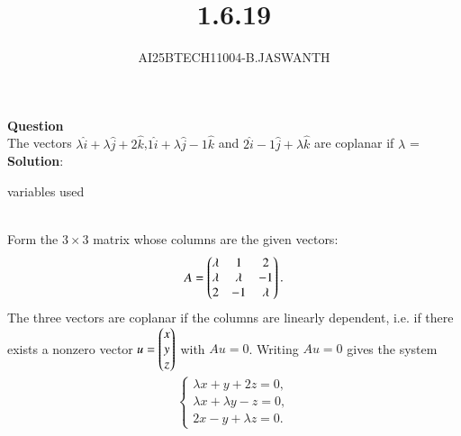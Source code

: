 \documentclass[journal]{IEEEtran}
\begin{document}

\vspace{3cm}


\renewcommand{\thetable}{\theenumi}




\vspace{3cm}


\title{1.6.19}
\author{AI25BTECH11004-B.JASWANTH}
{\let\newpage\relax\maketitle}


\renewcommand{\thefigure}{\theenumi}
\renewcommand{\thetable}{\theenumi}
\setlength{\intextsep}{10pt} %

\textbf{Question}\\
The vectors $\lambda\hat{i}+\lambda\hat{j}+2\hat{k}$,$1\hat{i}+\lambda\hat{j}-1\hat{k}$ and $2\hat{i}-1\hat{j}+\lambda\hat{k}$ are coplanar if $\lambda$ = \\
\textbf{Solution}: \\
\begin{table}[h!]
	\centering
	
	\caption{variables used}
	\label{}
\end{table}\\

Form the \(3\times3\) matrix whose columns are the given vectors:
\begin{align*}
A=\begin{pmatrix}\lambda & 1 & 2\\
\lambda & \lambda & -1\\
2 & -1 & \lambda\end{pmatrix}.
\end{align*}
The three vectors are coplanar if the columns are linearly dependent, i.e. if there exists a nonzero vector
\(u=\begin{pmatrix}x\\y\\z\end{pmatrix} \) with \(A u=0\).  Writing \(Au=0\) gives the system
\begin{align*}
\begin{cases}
\lambda x + y + 2z = 0,\\[4pt]
\lambda x + \lambda y - z = 0,\\[4pt]
2x - y + \lambda z = 0.
\end{cases}
\end{align*}
\end{document}

